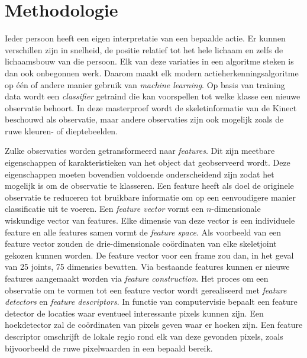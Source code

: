 \chapter{Methodologie}
\label{ch:methodologie}

Ieder persoon heeft een eigen interpretatie van een bepaalde actie. Er kunnen verschillen zijn in snelheid, de positie relatief tot het hele lichaam en zelfs de lichaamsbouw van die persoon. Elk van deze variaties in een algoritme steken is dan ook onbegonnen werk. Daarom maakt elk modern actieherkenningsalgoritme op één of andere manier gebruik van \textit{machine learning}. Op basis van training data wordt een \textit{classifier} getraind die kan voorspellen tot welke klasse een nieuwe observatie behoort. In deze masterproef wordt de skeletinformatie van de Kinect beschouwd als observatie, maar andere observaties zijn ook mogelijk zoals de ruwe kleuren- of dieptebeelden.

Zulke observaties worden getransformeerd naar \textit{features}. Dit zijn meetbare eigenschappen of karakteristieken van het object dat geobserveerd wordt. Deze eigenschappen moeten bovendien voldoende onderscheidend zijn zodat het mogelijk is om de observatie te klasseren. Een feature heeft als doel de originele observatie te reduceren tot bruikbare informatie om op een eenvoudigere manier classificatie uit te voeren. Een \textit{feature vector} vormt een $n$-dimensionale wiskundige vector van features. Elke dimensie van deze vector is een individuele feature en alle features samen vormt de \textit{feature space}. Als voorbeeld van een feature vector zouden de drie-dimensionale coördinaten van elke skeletjoint gekozen kunnen worden. De feature vector voor een frame zou dan, in het geval van 25 joints, 75 dimensies bevatten. Via bestaande features kunnen er nieuwe features aangemaakt worden via \textit{feature construction}. Het proces om een observatie om te vormen tot een feature vector wordt gerealiseerd met \textit{feature detectors} en \textit{feature descriptors}. In functie van computervisie bepaalt een feature detector de locaties waar eventueel interessante pixels kunnen zijn. Een hoekdetector zal de coördinaten van pixels geven waar er hoeken zijn. Een feature descriptor omschrijft de lokale regio rond elk van deze gevonden pixels, zoals bijvoorbeeld de ruwe pixelwaarden in een bepaald bereik.

